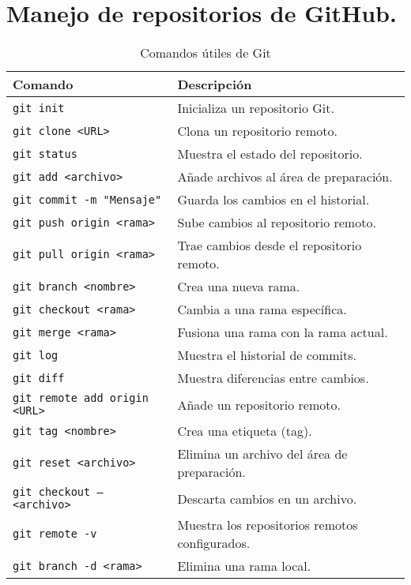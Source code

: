 \documentclass[10pt,a4paper]{book}
\begin{document}
\section{Manejo de repositorios de GitHub.}
\begin{table}[h!]
\centering
\begin{tabular}{|l|l|}
\hline
\textbf{Comando} & \textbf{Descripción} \\ \hline
\texttt{git init} & Inicializa un repositorio Git. \\ \hline
\texttt{git clone <URL>} & Clona un repositorio remoto. \\ \hline
\texttt{git status} & Muestra el estado del repositorio. \\ \hline
\texttt{git add <archivo>} & Añade archivos al área de preparación. \\ \hline
\texttt{git commit -m "Mensaje"} & Guarda los cambios en el historial. \\ \hline
\texttt{git push origin <rama>} & Sube cambios al repositorio remoto. \\ \hline
\texttt{git pull origin <rama>} & Trae cambios desde el repositorio remoto. \\ \hline
\texttt{git branch <nombre>} & Crea una nueva rama. \\ \hline
\texttt{git checkout <rama>} & Cambia a una rama específica. \\ \hline
\texttt{git merge <rama>} & Fusiona una rama con la rama actual. \\ \hline
\texttt{git log} & Muestra el historial de commits. \\ \hline
\texttt{git diff} & Muestra diferencias entre cambios. \\ \hline
\texttt{git remote add origin <URL>} & Añade un repositorio remoto. \\ \hline
\texttt{git tag <nombre>} & Crea una etiqueta (tag). \\ \hline
\texttt{git reset <archivo>} & Elimina un archivo del área de preparación. \\ \hline
\texttt{git checkout -- <archivo>} & Descarta cambios en un archivo. \\ \hline
\texttt{git remote -v} & Muestra los repositorios remotos configurados. \\ \hline
\texttt{git branch -d <rama>} & Elimina una rama local. \\ \hline
\end{tabular}
\caption{Comandos útiles de Git}
\label{tab:comandos-git}
\end{table}
\end{document}
